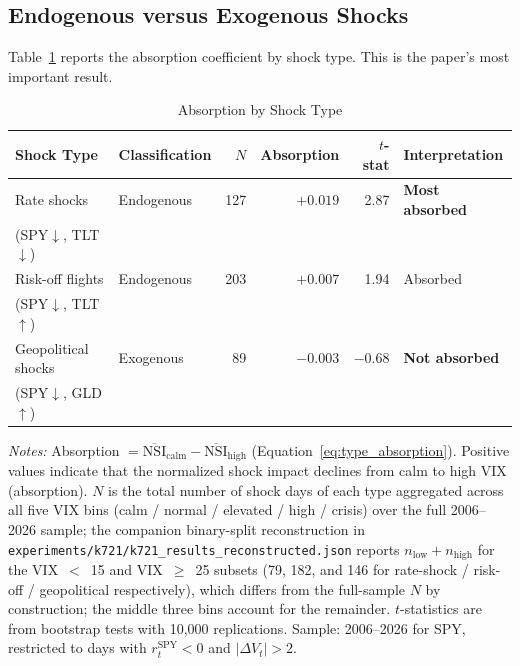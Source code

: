 \documentclass[12pt,a4paper]{article}
\begin{document}
\subsection{Endogenous versus Exogenous Shocks}
\label{sec:endo_exo}

Table~\ref{tab:shock_types} reports the absorption coefficient by shock type. This is the paper's most important result.

\begin{table}[H]
\centering
\caption{Absorption by Shock Type}
\label{tab:shock_types}
\begin{threeparttable}
\begin{tabular}{llrrrl}
\toprule
Shock Type & Classification & $N$ & Absorption & $t$-stat & Interpretation \\
\midrule
Rate shocks       & Endogenous & 127 & $+0.019$ & 2.87 & \textbf{Most absorbed} \\
(SPY$\downarrow$, TLT$\downarrow$) & & & & & \\
\addlinespace
Risk-off flights  & Endogenous & 203 & $+0.007$ & 1.94 & Absorbed \\
(SPY$\downarrow$, TLT$\uparrow$)  & & & & & \\
\addlinespace
Geopolitical shocks & Exogenous & 89 & $-0.003$ & $-0.68$ & \textbf{Not absorbed} \\
(SPY$\downarrow$, GLD$\uparrow$)  & & & & & \\
\bottomrule
\end{tabular}
\begin{tablenotes}
\small
\item \textit{Notes:} Absorption $= \overline{\text{NSI}}_{\text{calm}} - \overline{\text{NSI}}_{\text{high}}$ (Equation~\ref{eq:type_absorption}). Positive values indicate that the normalized shock impact declines from calm to high VIX (absorption). $N$ is the total number of shock days of each type aggregated across all five VIX bins (calm / normal / elevated / high / crisis) over the full 2006--2026 sample; the companion binary-split reconstruction in \texttt{experiments/k721/k721\_results\_reconstructed.json} reports $n_{\text{low}} + n_{\text{high}}$ for the VIX~$<$~15 and VIX~$\geq$~25 subsets (79, 182, and 146 for rate-shock / risk-off / geopolitical respectively), which differs from the full-sample $N$ by construction; the middle three bins account for the remainder. $t$-statistics are from bootstrap tests with 10,000 replications. Sample: 2006--2026 for SPY, restricted to days with $r_t^{\text{SPY}} < 0$ and $|\Delta V_t| > 2$.
\end{tablenotes}
\end{threeparttable}
\end{table}
\end{document}
